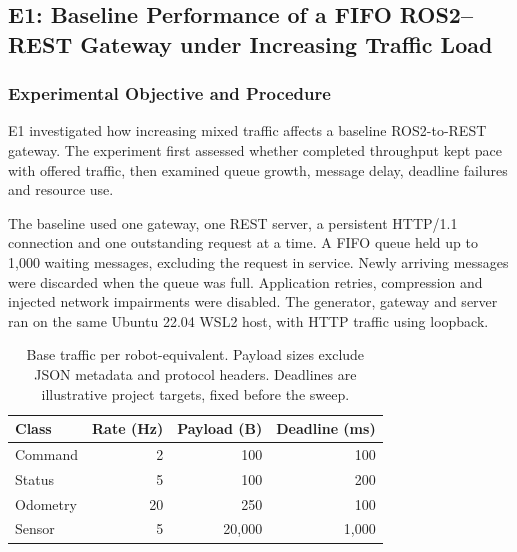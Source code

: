 
\subsection{E1: Baseline Performance of a FIFO ROS2--REST Gateway under Increasing Traffic Load}
\label{sec:e1story}

\subsubsection{Experimental Objective and Procedure}

E1 investigated how increasing mixed traffic affects a baseline
ROS2-to-REST gateway. The experiment first assessed whether completed
throughput kept pace with offered traffic, then examined queue growth,
message delay, deadline failures and resource use.

The baseline used one gateway, one REST server, a persistent HTTP/1.1
connection and one outstanding request at a time. A FIFO queue held up
to 1,000 waiting messages, excluding the request in service. Newly
arriving messages were discarded when the queue was full. Application
retries, compression and injected network impairments were disabled.
The generator, gateway and server ran on the same Ubuntu 22.04 WSL2
host, with HTTP traffic using loopback.

\begin{table}[htbp]
    \centering
    \caption{Base traffic per robot-equivalent. Payload sizes exclude
    JSON metadata and protocol headers. Deadlines are illustrative
    project targets, fixed before the sweep.}
    \label{tab:e1story-traffic}
    \small
    \setlength{\tabcolsep}{3pt}
    \begin{tabular}{lrrr}
        \toprule
        Class & Rate (Hz) & Payload (B) & Deadline (ms) \\
        \midrule
        Command  & 2  & 100    & 100 \\
        Status   & 5  & 100    & 200 \\
        Odometry & 20 & 250    & 100 \\
        Sensor   & 5  & 20,000 & 1,000 \\
        \bottomrule
    \end{tabular}
\end{table}

